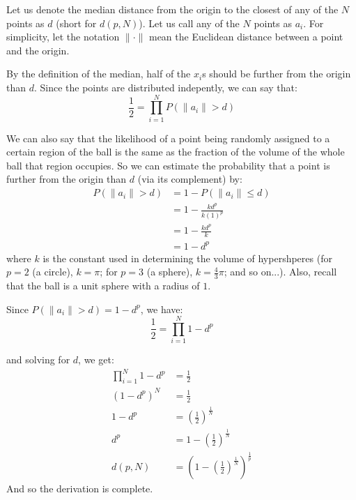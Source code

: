 \documentclass{article}
\begin{document}
Let us denote the median distance from the origin to the closest of any of the $N$ points as $d$ (short for $d(p, N)$). Let us call any of the $N$ points as $a_{i}$. For simplicity, let the notation $\|\cdot\|$ mean the Euclidean distance between a point and the origin.

By the definition of the median, half of the $x_{i}$s should be further from the origin than $d$. Since the points are distributed indepently, we can say that:
$$\frac{1}{2} = \prod_{i=1}^{N}{ P(\|a_{i}\| > d) }$$

We can also say that the likelihood of a point being randomly assigned to a certain region of the ball is the same as the fraction of the volume of the whole ball that region occupies. So we can estimate the probability that a point is further from the origin than $d$ (via its complement) by:
\begin{align*}
  P(\|a_{i}\| > d) &= 1 - P(\|a_{i}\| \le d)\\
                   &= 1 - \frac{kd^{p}}{k(1)^{p}}\\
                   &= 1 - \frac{kd^{p}}{k}\\
                   &= 1 - d^{p}
\end{align*}
where $k$ is the constant used in determining the volume of hypershperes (for $p=2$ (a circle), $k=\pi$; for $p=3$ (a sphere), $k=\frac{4}{3}\pi$; and so on...). Also, recall that the ball is a unit sphere with a radius of $1$.

Since $P(\|a_{i}\| > d) = 1 - d^{p}$, we have:
$$\frac{1}{2} = \prod_{i=1}^{N}{ 1 - d^{p} }$$

and solving for $d$, we get:
\begin{align*}
  \prod_{i=1}^{N}{ 1 - d^{p} } &= \frac{1}{2}\\
  (1 - d^{p})^{N}              &= \frac{1}{2}\\
  1 - d^{p}                    &= (\frac{1}{2})^{\frac{1}{N}}\\
  d^{p}                        &= 1 - (\frac{1}{2})^{\frac{1}{N}}\\
  d(p, N)                      &= (1 - (\frac{1}{2})^{\frac{1}{N}})^{\frac{1}{p}}
\end{align*}
And so the derivation is complete.
\newpage
\end{document}
